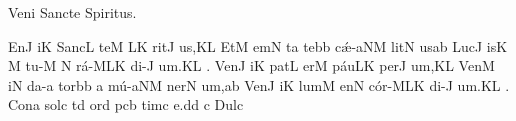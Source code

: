 \beginhymn Veni Sancte Spiritus.


\Internote
\nosolesmescustos
\initiumgregorianum
{}%
\sgn {}E{n}\punctum J\egn
\sgn {}i{}\punctum K\egn
\spatium
\sgn S{a}{nc}\punctum L\egn
\sgn te{}\punctum M\egn
\spatium
{}\clivis LK\egn
\sgn rit\punctum J\egn
\sgn {}u{s,}\punctum K\augmentum L\egn
\spatium
\divisiominor
\spatium
\sgn {}Et\punctum M\egn
\spatium
\sgn {}em\punctum N\egn
\sgn {}{\'\i}t\punctum a\egn
\sgn te{}\bmolle b\punctum b\egn
\spatium
\sgn c{\'\ae}-\climacus aNM\egn
\sgn lit\punctum N\egn
\sgn {}us\punctum a\augmentum b\egn
\spatium
\divisiominor
\spatium
\sgn L{u}c\punctum J\egn
\sgn {}is\punctum K\egn
\spatium
\custos M
\lineaproxima
\sgn t{u}{-}\punctum M\egn
\sgn {}{\ae}{}\punctum N\egn
\spatium
\sgn r{\'a}{-}\climacus MLK\egn
\sgn di{-}\punctum J\egn
\sgn {}u{m.}\punctum K\augmentum L\egn
\spatium
\divisiofinalis
{}.{}\egn
\spatium
\sgn V{e}n\punctum J\egn
\sgn {}i{}\punctum K\egn
\spatium
\sgn p{a}t\punctum L\egn
\sgn {}er\punctum M\egn
\spatium
\sgn p{\'a}u\clivis LK\egn
\sgn per\punctum J\egn
\sgn {}u{m,}\punctum K\augmentum L\egn
\spatium
\divisiominor
\spatium
\sgn V{e}n\punctum M\egn
\sgn {}i{}\punctum N\egn
\spatium
\sgn d{a}{-}\punctum a\egn
\sgn tor\bmolle b\punctum b\egn
\spatium
\custos a
\lineaproxima
\sgn m{\'u}{-}\climacus aNM\egn
\sgn ner\punctum N\egn
\sgn {}u{m,}\punctum a\augmentum b\egn
\spatium
\divisiominor
\spatium
\sgn V{e}n\punctum J\egn
\sgn {}i{}\punctum K\egn
\spatium
\sgn l{u}m\punctum M\egn
\sgn {}en\punctum N\egn
\spatium
\sgn c{\'o}{r-}\climacus MLK\egn
\sgn di{-}\punctum J\egn
\sgn {}u{m.}\punctum K\augmentum L\egn
\spatium
\divisiofinalis
{}.{}\egn
\spatium
\sgn Con\punctum a\egn
\sgn sol\punctum c\egn
{}t\punctum d\egn
\sgn {}or\punctum d\egn
\spatium
{}p\clivis cb\egn
\sgn tim\punctum c\egn
\sgn {}e.\punctum d\augmentum d\egn
\spatium
\divisiominor
\spatium
\custos c
\lineaproxima
\sgn D{u}l\punctum c\egn
